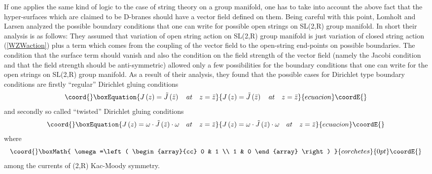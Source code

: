 \documentclass[a4paper,12pt]{article}
\begin{document}
If one applies the same kind of logic to the case of string theory on a
group manifold, one has to take into account the above fact that the
hyper-surfaces which are claimed to be D-branes should have a vector field
defined on them. Being careful with this point, Lomholt and Larsen \cite
{lomholt} analyzed the possible boundary conditions that one can write for
possible open strings on SL(2,R) group manifold. In short their analysis is
as follows: They assumed that variation of open string action on SL(2,R)
group manifold is just variation of closed string action (\ref{WZWaction})
plus a term which comes from the coupling of the vector field to the
open-string end-points on possible boundaries. The condition that the
surface term should vanish and also the condition on the field strength of
the vector field (namely the Jacobi condition and that the field strength
should be anti-symmetric) allowed only a few possibilities for the boundary
conditions that one can write for the open strings on SL(2,R) group
manifold. As a result of their analysis, they found that the possible cases
for Dirichlet type boundary conditions are firstly ``regular'' Dirichlet
gluing conditions
\begin{equation}\coord{}\boxEquation{
J\left( z\right) =\tilde{J}\left( \bar{z}\right) \quad at\quad z=\bar{z}
\label{regular}
}{
J\left( z\right) =\tilde{J}\left( \bar{z}\right) \quad at\quad z=\bar{z}
}{ecuacion}\coordE{}\end{equation}
and secondly so called ``twisted'' Dirichlet gluing conditions
\begin{equation}\coord{}\boxEquation{
J\left( z\right) =\omega \cdot \tilde{J}\left( \bar{z}\right) \cdot \omega
\quad at\quad z=\bar{z}  \label{twisted}
}{
J\left( z\right) =\omega \cdot \tilde{J}\left( \bar{z}\right) \cdot \omega
\quad at\quad z=\bar{z}  }{ecuacion}\coordE{}\end{equation}
where
\[\coord{}\boxMath{
\omega =\left(
\begin{array}{cc}
0 & 1 \\
1 & 0
\end{array}
\right)
}{corchetes}{0pt}\coordE{}\]
among the currents of \coordHE{}(2,R) Kac-Moody symmetry.
\end{document}
